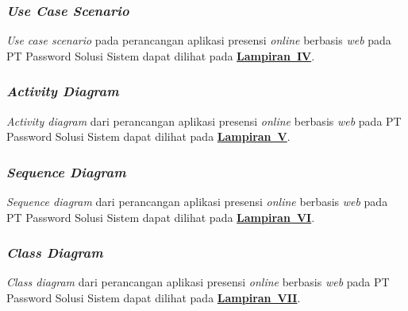 \subsubsection{\textit{Use Case Scenario}}
\textit{Use case scenario} pada perancangan aplikasi presensi \textit{online} berbasis \textit{web} pada PT Password Solusi Sistem dapat dilihat pada \hyperref[sec:use-case-scenario-aplikasi-presensi-online]{\textbf{Lampiran~IV}}.

\subsubsection{\textit{Activity Diagram}}
\textit{Activity diagram} dari perancangan aplikasi presensi \textit{online} berbasis \textit{web} pada PT Password Solusi Sistem dapat dilihat pada \hyperref[sec:activity-diagram-aplikasi-presensi-online]{\textbf{Lampiran~V}}.

\subsubsection{\textit{Sequence Diagram}}
\textit{Sequence diagram} dari perancangan aplikasi presensi \textit{online} berbasis \textit{web} pada PT Password Solusi Sistem dapat dilihat pada \hyperref[sec:sequence-diagram-aplikasi-presensi-online]{\textbf{Lampiran~VI}}.

\subsubsection{\textit{Class Diagram}}
\textit{Class diagram} dari perancangan aplikasi presensi \textit{online} berbasis \textit{web} pada PT Password Solusi Sistem dapat dilihat pada \hyperref[sec:class-diagram-aplikasi-presensi-online]{\textbf{Lampiran~VII}}.